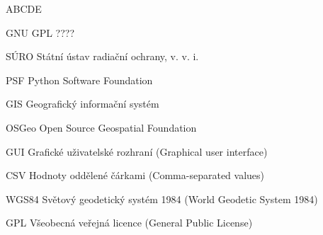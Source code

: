 
\begin{seznamzkratek}{ABCDE}

	      {GNU GPL}
	      {????}

	      {SÚRO}
	      {Státní ústav radiační ochrany, v. v. i.}
	      
		  {PSF}
	      {Python Software Foundation}

	      {GIS}
	      {Geografický informační systém}

	      {OSGeo}
	      {Open Source Geospatial Foundation}
	         
	      {GUI}
	      {Grafické uživatelské rozhraní (Graphical user interface)}
	      
	      {CSV}
	      {Hodnoty oddělené čárkami (Comma-separated values)}
	      
	      {WGS84}
	      {Světový geodetický systém 1984 (World Geodetic System 1984)}

	      {GPL}
	      {Všeobecná veřejná licence (General Public License)}

\end{seznamzkratek}